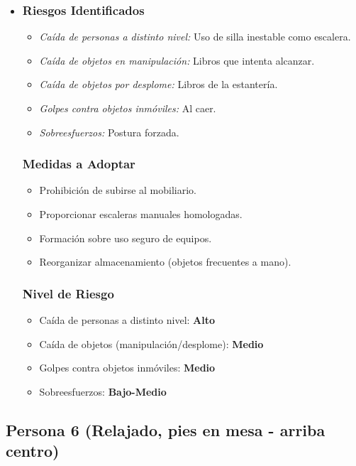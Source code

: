 \documentclass[12pt,a4paper]{article}
\begin{document}
	\begin{itemize}
		\item \subsubsection{Riesgos Identificados}
		\begin{itemize}
			\item \textit{Caída de personas a distinto nivel:} Uso de silla inestable como escalera.
			\item \textit{Caída de objetos en manipulación:} Libros que intenta alcanzar.
			\item \textit{Caída de objetos por desplome:} Libros de la estantería.
			\item \textit{Golpes contra objetos inmóviles:} Al caer.
			\item \textit{Sobreesfuerzos:} Postura forzada.
		\end{itemize}
		\subsubsection{Medidas a Adoptar}
		\begin{itemize}
			\item Prohibición de subirse al mobiliario.
			\item Proporcionar escaleras manuales homologadas.
			\item Formación sobre uso seguro de equipos.
			\item Reorganizar almacenamiento (objetos frecuentes a mano).
		\end{itemize}
		\subsubsection{Nivel de Riesgo}
		\begin{itemize}
			\item Caída de personas a distinto nivel: \textbf{Alto}
			\item Caída de objetos (manipulación/desplome): \textbf{Medio}
			\item Golpes contra objetos inmóviles: \textbf{Medio}
			\item Sobreesfuerzos: \textbf{Bajo-Medio}
		\end{itemize}
	\end{itemize}
	
	\hrulefill
	
	\subsection{Persona 6 (Relajado, pies en mesa - arriba centro)}
	\label{subsec:persona6} %
	
\end{document}
